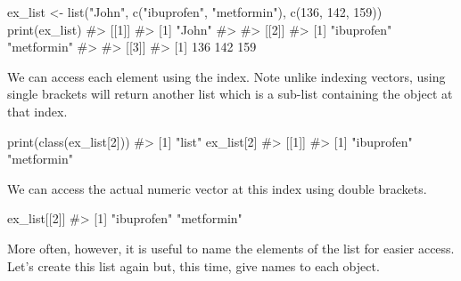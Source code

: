 \documentclass[
  letterpaper,
]{latex/krantz}
\makeatletter
\newenvironment{Shaded}{\begin{snugshade}}{\end{snugshade}}
\newcommand{\CommentTok}[1]{\textcolor[rgb]{0.37,0.37,0.37}{#1}}
\newcommand{\DecValTok}[1]{\textcolor[rgb]{0.68,0.00,0.00}{#1}}
\newcommand{\FunctionTok}[1]{\textcolor[rgb]{0.28,0.35,0.67}{#1}}
\newcommand{\NormalTok}[1]{\textcolor[rgb]{0.00,0.23,0.31}{#1}}
\newcommand{\OtherTok}[1]{\textcolor[rgb]{0.00,0.23,0.31}{#1}}
\newcommand{\StringTok}[1]{\textcolor[rgb]{0.13,0.47,0.30}{#1}}
\newenvironment{kframe}{%
\medskip{}
\setlength{\fboxsep}{.8em}
 \def\at@end@of@kframe{}%
 \ifinner\ifhmode%
  \def\at@end@of@kframe{\end{minipage}}%
  \begin{minipage}{\columnwidth}%
 \fi\fi%
 \def\FrameCommand##1{\hskip\@totalleftmargin \hskip-\fboxsep
 \colorbox{shadecolor}{##1}\hskip-\fboxsep
     \hskip-\linewidth \hskip-\@totalleftmargin \hskip\columnwidth}%
 \MakeFramed {\advance\hsize-\width
   \@totalleftmargin\z@ \linewidth\hsize
   \@setminipage}}%
 {\par\unskip\endMakeFramed%
 \at@end@of@kframe}
\renewenvironment{Shaded}{\begin{kframe}}{\end{kframe}}
\makeatother
\begin{document}
\begin{Shaded}
\begin{Highlighting}[]
\NormalTok{ex\_list }\OtherTok{\textless{}{-}} \FunctionTok{list}\NormalTok{(}\StringTok{"John"}\NormalTok{, }\FunctionTok{c}\NormalTok{(}\StringTok{"ibuprofen"}\NormalTok{, }\StringTok{"metformin"}\NormalTok{), }
                \FunctionTok{c}\NormalTok{(}\DecValTok{136}\NormalTok{, }\DecValTok{142}\NormalTok{, }\DecValTok{159}\NormalTok{))}
\FunctionTok{print}\NormalTok{(ex\_list)}
\CommentTok{\#\textgreater{} [[1]]}
\CommentTok{\#\textgreater{} [1] "John"}
\CommentTok{\#\textgreater{} }
\CommentTok{\#\textgreater{} [[2]]}
\CommentTok{\#\textgreater{} [1] "ibuprofen" "metformin"}
\CommentTok{\#\textgreater{} }
\CommentTok{\#\textgreater{} [[3]]}
\CommentTok{\#\textgreater{} [1] 136 142 159}
\end{Highlighting}
\end{Shaded}

We can access each element using the index. Note
unlike indexing vectors, using single brackets will return another list
which is a sub-list containing the object at that index.

\begin{Shaded}
\begin{Highlighting}[]
\FunctionTok{print}\NormalTok{(}\FunctionTok{class}\NormalTok{(ex\_list[}\DecValTok{2}\NormalTok{]))}
\CommentTok{\#\textgreater{} [1] "list"}
\NormalTok{ex\_list[}\DecValTok{2}\NormalTok{]}
\CommentTok{\#\textgreater{} [[1]]}
\CommentTok{\#\textgreater{} [1] "ibuprofen" "metformin"}
\end{Highlighting}
\end{Shaded}

We can access the actual numeric vector at this index using double
brackets.

\begin{Shaded}
\begin{Highlighting}[]
\NormalTok{ex\_list[[}\DecValTok{2}\NormalTok{]]}
\CommentTok{\#\textgreater{} [1] "ibuprofen" "metformin"}
\end{Highlighting}
\end{Shaded}

More often, however, it is useful to name the elements of the list for
easier access. Let's create this list again but,
this time, give names to each object.
\end{document}
